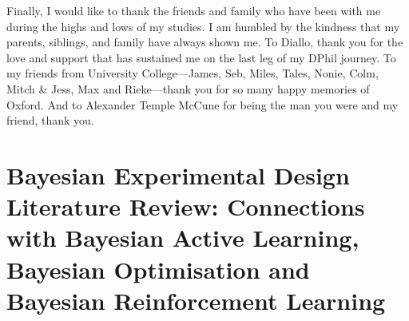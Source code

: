 \documentclass[a4paper, 10pt]{report}
\theoremstyle{plain}
\begin{document}
	Finally, I would like to thank the friends and family who have been with me during the highs and lows of my studies.
	I am humbled by the kindness that my parents, siblings, and family have always shown me.
	To Diallo, thank you for the love and support that has sustained me on the last leg of my DPhil journey.
	To my friends from University College---James, Seb, Miles, Tales, Nonie, Colm, Mitch \& Jess, Max and Rieke---thank you for so many happy memories of Oxford.
	And to Alexander Temple McCune for being the man you were and my friend, thank you.
	
	
	\tableofcontents
	
	
\newpage
	
	
	
	\chapter{Bayesian Experimental Design Literature Review: Connections with Bayesian Active Learning, Bayesian Optimisation and Bayesian Reinforcement Learning}
	\label{chap:intro}
	
\end{document}
